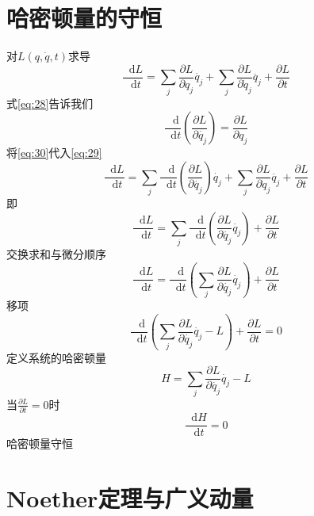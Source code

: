 \documentclass{article}
\newcommand*{\dif}{\mathop{}\!\mathrm{d}}
\begin{document}
\section{哈密顿量的守恒}

对$L \left( q, \dot{q} ,t \right)$求导
\begin{equation}
  \label{eq:29}
  \frac{\dif L}{\dif t} = \sum\limits_{j} \frac{\partial L}{\partial q_{j}} \dot{q_{j}} + \sum\limits_{j} \frac{\partial L}{\partial \dot{q}_{j}} \ddot{q_{j}} + \frac{\partial L}{\partial t}
\end{equation}
式\ref{eq:28}告诉我们
\begin{equation}
  \label{eq:30}
  \frac{\dif}{\dif t} \left( \frac{\partial L}{\partial \dot{q_{j}}} \right) = \frac{\partial L}{\partial q_{j}}
\end{equation}
将\ref{eq:30}代入\ref{eq:29}
\begin{equation}
  \label{eq:31}
  \frac{\dif L}{\dif t} = \sum\limits_{j}\frac{\dif}{\dif t} \left( \frac{\partial L}{\partial \dot{q_{j}}} \right)  \dot{q_{j}} + \sum\limits_{j} \frac{\partial L}{\partial \dot{q}_{j}} \ddot{q_{j}} + \frac{\partial L}{\partial t}
\end{equation}
即
\begin{equation}
  \label{eq:32}
  \frac{\dif L}{\dif t} = \sum\limits_{j}\frac{\dif}{\dif t} \left( \frac{\partial L}{\partial \dot{q_{j}}} \dot{q_{j}} \right) + \frac{\partial L}{\partial t}
\end{equation}
交换求和与微分顺序
\begin{equation}
  \label{eq:33}
  \frac{\dif L}{\dif t} = \frac{\dif}{\dif t} \left( \sum\limits_{j}  \frac{\partial L}{\partial \dot{q_{j}}} \dot{q_{j}} \right) + \frac{\partial L}{\partial t}
\end{equation}
移项
\begin{equation}
  \label{eq:34}
  \frac{\dif}{\dif t} \left( \sum\limits_{j} \frac{\partial L}{\partial \dot{q_{j}}} \dot{q_{j}} -L \right) + \frac{\partial L}{\partial t} = 0
\end{equation}
定义系统的哈密顿量
\begin{equation}
  \label{eq:35}
  H = \sum\limits_{j} \frac{\partial L}{\partial \dot{q_{j}}} \dot{q_{j}} -L 
\end{equation}
当$\frac{\partial L}{\partial t}=0$时
\begin{equation}
  \label{eq:36}
  \frac{\dif H}{\dif t} = 0
\end{equation}
哈密顿量守恒

\section{Noether定理与广义动量}
\end{document}
